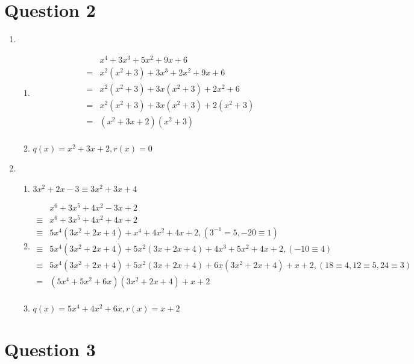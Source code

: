 \documentclass{article}
\begin{document}
\newpage

\section*{Question 2}

\begin{enumerate}
    \item 
    \begin{enumerate}
        \item \begin{align*}
        &x^4+3x^3+5x^2+9x+6\\
        =&x^2(x^2+3)+3x^3+2x^2+9x+6\\
        =&x^2(x^2+3)+3x(x^2+3)+2x^2+6\\
        =&x^2(x^2+3)+3x(x^2+3)+2(x^2+3)\\
        =&(x^2+3x+2)(x^2+3)\\
    \end{align*}
    \item $q(x)=x^2+3x+2,r(x)=0$
    \end{enumerate}
    \item 
    \begin{enumerate}
        \item $3x^2+2x-3\equiv 3x^2+3x+4$
        \item \begin{align*}
            &x^6+3x^5+4x^2-3x+2\\
            \equiv&x^6+3x^5+4x^2+4x+2\\
            \equiv&5x^4(3x^2+2x+4)+x^4+4x^2+4x+2,(3^{-1}=5,-20\equiv 1)\\
            \equiv&5x^4(3x^2+2x+4)+5x^2(3x+2x+4)+4x^3+5x^2+4x+2,(-10\equiv 4)\\
            \equiv&5x^4(3x^2+2x+4)+5x^2(3x+2x+4)+6x(3x^2+2x+4)+x+2,(18\equiv 4,12\equiv 5,24\equiv 3)\\
            =&(5x^4+5x^2+6x)(3x^2+2x+4)+x+2\\
        \end{align*}
        \item $q(x)=5x^4+4x^2+6x,r(x)=x+2$
    \end{enumerate}
\end{enumerate}

\newpage

\section*{Question 3}
\end{document}
